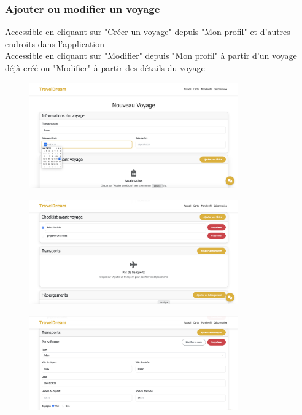 \documentclass[a4paper,12pt]{article}
\begin{document}
\subsubsection{Ajouter ou modifier un voyage}
Accessible en cliquant sur "Créer un voyage" depuis "Mon profil" et d'autres endroits dans l'application\\
Accessible en cliquant sur "Modifier" depuis "Mon profil" à partir d'un voyage déjà créé ou "Modifier" à partir des détails du voyage
\begin{figure}[H]
    \centering
    \includegraphics[width=0.8\textwidth]{8_creation_voyage_1.png}
\end{figure}
\begin{figure}[H]
    \centering
    \includegraphics[width=0.8\textwidth]{8_creation_voyage_2.png}
\end{figure}
\begin{figure}[H]
    \centering
    \includegraphics[width=0.8\textwidth]{8_creation_voyage_3.png}
\end{figure}
\end{document}
